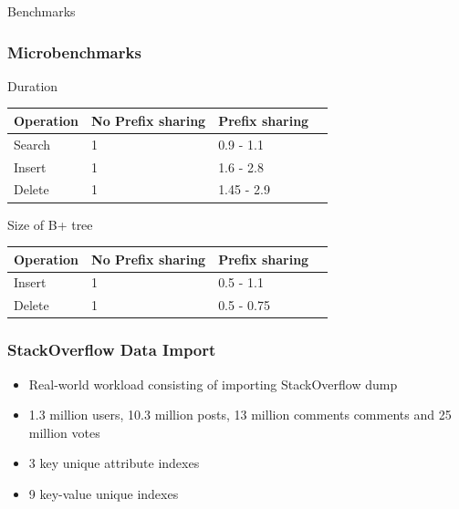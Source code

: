 \documentclass{beamer}
\begin{document}
  \begin{section}{Benchmarks}
    
    \begin{frame}
      \frametitle{Microbenchmarks}
        
        \begin{block}{Duration}
        
        \end{block}
       \begin{tabular}{| l | l | l | l |}
        \hline
        Operation & No Prefix sharing & Prefix sharing \\ \hline 
        Search & 1 & 0.9 - 1.1  \\ \hline 
        Insert & 1 & 1.6 - 2.8  \\ \hline 
        Delete & 1 & 1.45 - 2.9  \\ \hline 
      \end{tabular}
      
        \begin{block}{
        Size of B+ tree}
        \end{block}
       \begin{tabular}{| l | l | l | l |}
        \hline
        Operation & No Prefix sharing & Prefix sharing \\ \hline 
        Insert & 1 & 0.5 - 1.1  \\ \hline 
        Delete & 1 & 0.5 - 0.75  \\ \hline 
      \end{tabular}
    \end{frame}

    \begin{frame}
      \frametitle{StackOverflow Data Import}
        \begin{itemize}
        \item Real-world workload consisting of importing StackOverflow dump
        \item 1.3 million users, 10.3 million posts, 13 million comments comments and 25 million votes     
        \item 3 key unique attribute indexes 
        \item 9 key-value unique indexes
        \end{itemize}
    \end{frame}
    

\end{section}
\end{document}
